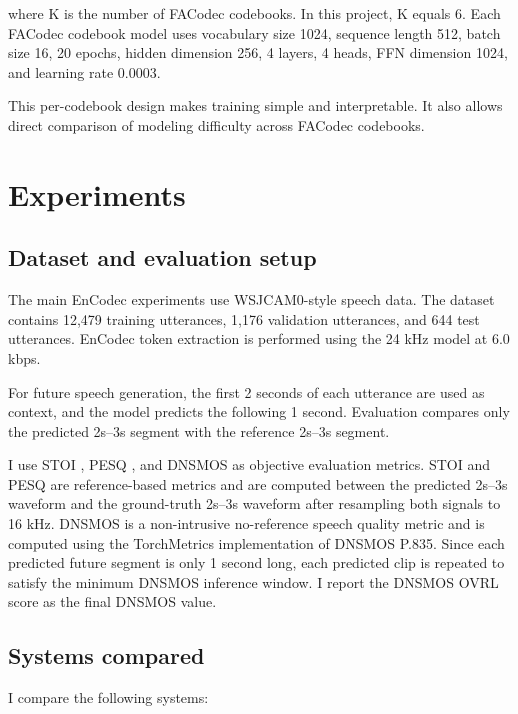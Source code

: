 \documentclass{article}
\begin{document}
	where K is the number of FACodec codebooks. In this project, K equals 6. Each FACodec codebook model uses vocabulary size 1024, sequence length 512, batch size 16, 20 epochs, hidden dimension 256, 4 layers, 4 heads, FFN dimension 1024, and learning rate 0.0003.
	
	This per-codebook design makes training simple and interpretable. It also allows direct comparison of modeling difficulty across FACodec codebooks.
	
	\section{Experiments}
	\label{sec:experiments}
	
	\subsection{Dataset and evaluation setup}
	
	The main EnCodec experiments use WSJCAM0-style speech data. The dataset contains 12,479 training utterances, 1,176 validation utterances, and 644 test utterances. EnCodec token extraction is performed using the 24 kHz model at 6.0 kbps.
	
	For future speech generation, the first 2 seconds of each utterance are used as context, and the model predicts the following 1 second. Evaluation compares only the predicted 2s--3s segment with the reference 2s--3s segment.
	
	I use STOI \cite{taal2011stoi}, PESQ \cite{rix2001pesq}, and DNSMOS \cite{reddy2022dnsmos} as objective evaluation metrics. STOI and PESQ are reference-based metrics and are computed between the predicted 2s--3s waveform and the ground-truth 2s--3s waveform after resampling both signals to 16 kHz. DNSMOS is a non-intrusive no-reference speech quality metric and is computed using the TorchMetrics implementation of DNSMOS P.835. Since each predicted future segment is only 1 second long, each predicted clip is repeated to satisfy the minimum DNSMOS inference window. I report the DNSMOS OVRL score as the final DNSMOS value.
	
	\subsection{Systems compared}
	
	I compare the following systems:
	
\end{document}
